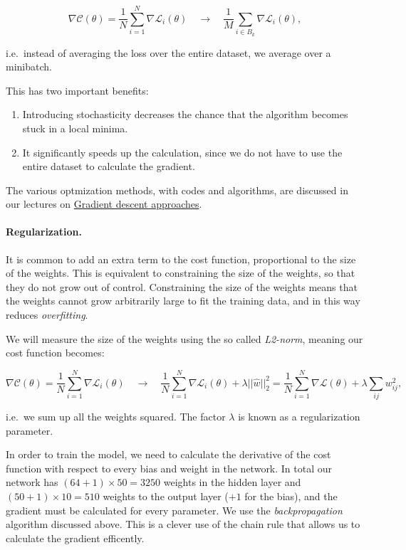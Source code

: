 \documentclass[%
oneside,                 %
final,                   %
10pt]{article}
\begin{document}
$$ \nabla \mathcal{C}(\theta) = \frac{1}{N} \sum_{i=1}^N \nabla \mathcal{L}_i(\theta) \quad \rightarrow \quad
\frac{1}{M} \sum_{i \in B_k} \nabla \mathcal{L}_i(\theta) ,$$

i.e.~instead of averaging the loss over the entire dataset, we average over a minibatch.  

This has two important benefits:  
\begin{enumerate}
\item Introducing stochasticity decreases the chance that the algorithm becomes stuck in a local minima.  

\item It significantly speeds up the calculation, since we do not have to use the entire dataset to calculate the gradient.  
\end{enumerate}

\noindent
The various optmization  methods, with codes and algorithms,  are discussed in our lectures on \href{{https://compphysics.github.io/MachineLearning/doc/pub/Splines/html/Splines-bs.html}}{Gradient descent approaches}.

\paragraph{Regularization.}
It is common to add an extra term to the cost function, proportional
to the size of the weights.  This is equivalent to constraining the
size of the weights, so that they do not grow out of control.
Constraining the size of the weights means that the weights cannot
grow arbitrarily large to fit the training data, and in this way
reduces \emph{overfitting}.

We will measure the size of the weights using the so called \emph{L2-norm}, meaning our cost function becomes:  

$$ \nabla \mathcal{C}(\theta) = \frac{1}{N} \sum_{i=1}^N \nabla \mathcal{L}_i(\theta) \quad \rightarrow \quad
\frac{1}{N} \sum_{i=1}^N \nabla \mathcal{L}_i(\theta) + \lambda \lvert \lvert \hat{w} \rvert \rvert_2^2 
= \frac{1}{N} \sum_{i=1}^N \nabla \mathcal{L}(\theta) + \lambda \sum_{ij} w_{ij}^2,$$  

i.e.~we sum up all the weights squared. The factor $\lambda$ is known as a regularization parameter.


In order to train the model, we need to calculate the derivative of
the cost function with respect to every bias and weight in the
network.  In total our network has $(64 + 1)\times 50=3250$ weights in
the hidden layer and $(50 + 1)\times 10=510$ weights to the output
layer ($+1$ for the bias), and the gradient must be calculated for
every parameter.  We use the \emph{backpropagation} algorithm discussed
above. This is a clever use of the chain rule that allows us to
calculate the gradient efficently. 
\end{document}
